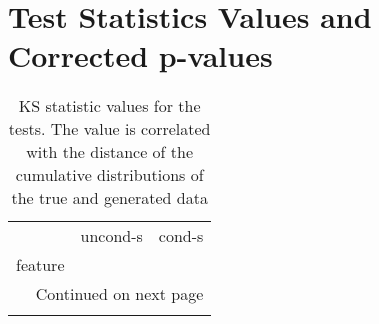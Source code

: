 \appendix
\chapter{Test Statistics Values and Corrected p-values}

\begin{longtable}{lrr}
	\caption[KS statistic values]{ \small KS statistic values for the tests. The value is correlated with the distance of the cumulative distributions of the true and generated data}\\
	\toprule
	{} &  uncond-s &    cond-s \\
	feature                       &           &           \\
	\midrule
	\endhead
	\midrule
	\multicolumn{3}{r}{{Continued on next page}} \\
	\midrule
	\endfoot
	

\end{longtable}
